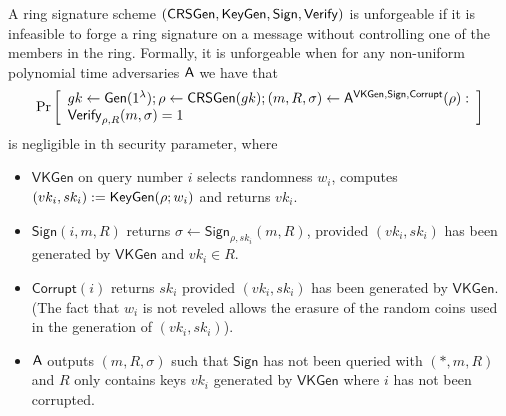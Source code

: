\begin{definition}
A ring signature scheme $(\mathsf{CRSGen}, \mathsf{KeyGen}, \mathsf{Sign}, \mathsf{Verify})$
is unforgeable if it is infeasible to forge a ring
signature on a message without controlling one of the members in the ring. Formally, it
is unforgeable when for any non-uniform polynomial
time adversaries $\mathsf{A}$ we have that
$$
\Pr\left[\begin{array}{l}
gk\gets\mathsf{Gen}(1^\lambda);\rho\gets\mathsf{CRSGen}(gk);(m,R,\sigma)\gets\mathsf{A}^{\mathsf{VKGen},\mathsf{Sign},\mathsf{Corrupt}}(\rho):\\
\mathsf{Verify}_{\rho,R}(m,\sigma)=1
\end{array}\right]
$$
is negligible in th security parameter, where

\begin{itemize}
\item $\mathsf{VKGen}$ on query number $i$ selects randomness $w_i$, computes $(vk_i,sk_i):= \mathsf{KeyGen}(\rho; w_i)$
and returns $vk_i$.
\item $\mathsf{Sign}(i, m, R)$ returns $\sigma \gets \mathsf{Sign}_{\rho,sk_i}(m, R)$, provided $(vk_i, sk_i)$ has been generated
by $\mathsf{VKGen}$ and $vk_i\in R$.
\item $\mathsf{Corrupt}(i)$ returns $sk_i$  provided $(vk_i, sk_i)$ has
been generated by $\mathsf{VKGen}$. (The fact that $w_i$ is not reveled allows the erasure of the random coins used in the generation of $(vk_i, sk_i)$).
\item $\mathsf{A}$ outputs $(m, R, \sigma)$ such that $\mathsf{Sign}$ has not been queried with $(*, m, R)$ and $R$
only contains keys $vk_i$ generated by $\mathsf{VKGen}$ where $i$ has not been corrupted.
\end{itemize}
\end{definition}

